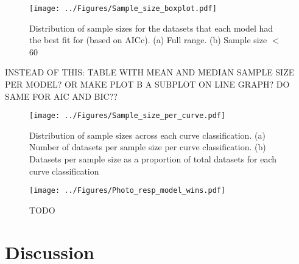 \documentclass[11pt]{article}
\begin{document}
\begin{figure} [H]
	\texttt{[image: ../Figures/Sample\_size\_boxplot.pdf]}
	\caption{\label{fig:sample_size_box} Distribution of sample sizes for the datasets that each model had the best fit for (based on AICc). (a) Full range. (b) Sample size $<$ 60 }
\end{figure}

INSTEAD OF THIS: TABLE WITH MEAN AND MEDIAN SAMPLE SIZE PER MODEL? OR MAKE PLOT B A SUBPLOT ON LINE GRAPH? DO SAME FOR AIC AND BIC??
\begin{figure} [H]
	\texttt{[image: ../Figures/Sample\_size\_per\_curve.pdf]}
	\caption{\label{fig:sample_size_per_curve} Distribution of sample sizes across each curve classification. (a) Number of datasets per sample size per curve classification. (b) Datasets per sample size as a proportion of total datasets for each curve classification}
\end{figure}












\begin{figure} [H]
	\texttt{[image: ../Figures/Photo\_resp\_model\_wins.pdf]}
	\caption{\label{fig:photo_resp_model} TODO}
\end{figure}


\section{Discussion}
\end{document}
